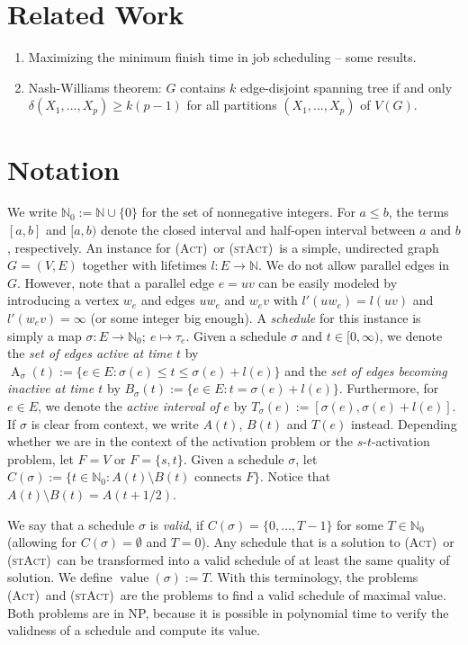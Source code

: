 \documentclass[10pt,a4paper]{article}
\numberwithin{equation}{section}
\newcommand{\N}{\mathbb{N}}
\newcommand{\set}[1]{\{ #1 \}}
\newcommand{\fromto}[2]{\set{#1, \ldots, #2}}
\newcommand{\act}{\textsc{(Act)}}
\newcommand{\stact}{\textsc{(stAct)}}
\DeclareMathOperator{\ac}{\text{A}}
\DeclareMathOperator{\val}{\text{value}}
\begin{document}
\section{Related Work}

\begin{enumerate}
\item Maximizing the minimum finish time in job scheduling -- some results.
\item Nash-Williams theorem: $G$ contains $k$ edge-disjoint spanning tree if and only $\delta(X_1, \dots, X_p) \geq k(p - 1)$ for all partitions $(X_1, \dots, X_p)$ of $V(G)$. 
\end{enumerate}

\section{Notation}
\label{sec_notation}

We write $\N_0 := \N \cup \set{0}$ for the set of nonnegative integers. For $a \leq b$, the terms $[a, b]$ and $[a, b)$ denote the closed interval and half-open interval between $a$ and $b$, respectively. An instance for \act\ or \stact\ is a simple, undirected graph $G = (V, E)$ together with lifetimes $l : E \rightarrow \N$. We do not allow parallel edges in $G$. However, note that a parallel edge $e = uv$ can be easily modeled by introducing a vertex $w_e$ and edges $uw_e$ and $w_ev$ with $l'(uw_e) = l(uv)$ and $l'(w_ev) = \infty$ (or some integer big enough). A \emph{schedule} for this instance is simply a map $\sigma : E \rightarrow \N_0;\ e \mapsto \tau_e$. Given a schedule $\sigma$ and $t \in [0, \infty)$, we denote the \emph{set of edges active at time $t$} by $\ac_\sigma (t) := \set{e \in E : \sigma(e) \leq t \leq \sigma(e) + l(e)}$ and the \emph{set of edges becoming inactive at time $t$} by $B_\sigma (t) := \set{e \in E : t = \sigma(e) + l(e)}$. Furthermore, for $e \in E$, we denote the \emph{active interval of $e$} by $T_\sigma(e) := [\sigma(e), \sigma(e) + l(e)]$. If $\sigma$ is clear from context, we write $A(t)$, $B(t)$ and $T(e)$ instead. Depending whether we are in the context of the activation problem or the $s$-$t$-activation problem, let $F = V$ or $F = \set{s,t}$. Given a schedule $\sigma$, let $C(\sigma) := \set{t \in \N_0 : A(t) \setminus B(t) \text{ connects }F}$. Notice that $A(t) \setminus B(t) = A(t+1/2)$.


We say that a schedule $\sigma$ is \emph{valid}, if $C(\sigma) = \fromto{0}{T-1}$ for some $T \in \N_0$ (allowing for $C(\sigma) = \emptyset$ and $T = 0$). Any schedule that is a solution to \act\ or \stact\ can be transformed into a valid schedule of at least the same quality of solution. We define $\val(\sigma) := T$. With this terminology, the problems \act\ and \stact\ are the problems to find a valid schedule of maximal value. Both problems are in NP, because it is possible in polynomial time to verify the validness of a schedule and compute its value.
\end{document}
